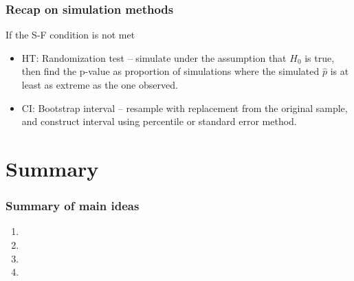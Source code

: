 \documentclass[slidestop,compress,mathserif,12pt,t,professionalfonts,xcolor=table]{beamer}
\begin{document}

\begin{frame}
\frametitle{Recap on simulation methods}

If the S-F condition is not met

\begin{itemize}

\item HT: Randomization test -- simulate under the assumption that $H_0$ is true, then find the p-value as proportion of simulations where the simulated $\hat{p}$ is at least as extreme as the one observed.

\item CI: Bootstrap interval -- resample with replacement from the original sample, and construct interval using percentile or standard error method.

\end{itemize}


\end{frame}


\section{Summary}


\begin{frame}
\frametitle{Summary of main ideas}

\vfill

\begin{enumerate}

\item {}

\item {}

\item {}

\item {}

\end{enumerate}

\vfill

\end{frame}

\end{document}
